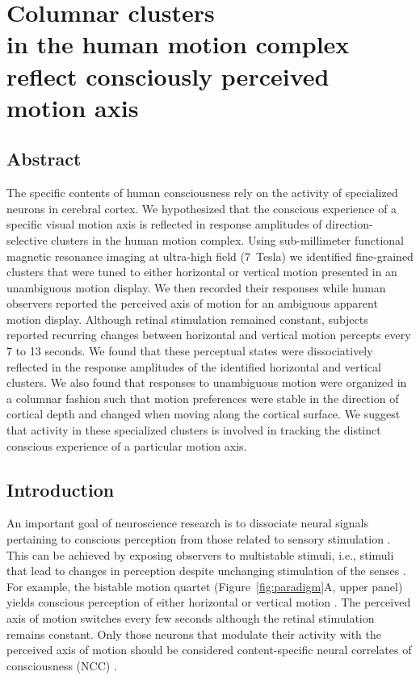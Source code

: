 \chapter[Columnar clusters in the human motion complex\\ reflect consciously perceived motion axis]{Columnar clusters\\ in the human motion complex\\ reflect consciously perceived\\ motion axis}
\label{ch:chapter03}
\papercitetwo

\clearpage{\thispagestyle{empty}\cleardoublepage}

\section{Abstract}
The specific contents of human consciousness rely on the activity of specialized neurons in cerebral cortex. We hypothesized that the conscious experience of a specific visual motion axis is reflected in response amplitudes of direction-selective clusters in the human motion complex. Using sub-millimeter functional magnetic resonance imaging at ultra-high field (7~Tesla) we identified fine-grained clusters that were tuned to either horizontal or vertical motion presented in an unambiguous motion display. We then recorded their responses while human observers reported the perceived axis of motion for an ambiguous apparent motion display. Although retinal stimulation remained constant, subjects reported recurring changes between horizontal and vertical motion percepts every 7 to 13 seconds. We found that these perceptual states were dissociatively reflected in the response amplitudes of the identified horizontal and vertical clusters. We also found that responses to unambiguous motion were organized in a columnar fashion such that motion preferences were stable in the direction of cortical depth and changed when moving along the cortical surface. We suggest that activity in these specialized clusters is involved in tracking the distinct conscious experience of a particular motion axis.

\section{Introduction}
An important goal of neuroscience research is to dissociate neural signals pertaining to conscious perception from those related to sensory stimulation \parencite{Logothetis1989}. This can be achieved by exposing observers to multistable stimuli, i.e., stimuli that lead to changes in perception despite unchanging stimulation of the senses \parencite{Leopold1999, Sterzer2009, Brascamp2018}. For example, the bistable motion quartet (Figure~\ref{fig:paradigm}A, upper panel) yields conscious perception of either horizontal or vertical motion \parencite{Ramachandran1985}. The perceived axis of motion switches every few seconds although the retinal stimulation remains constant. Only those neurons that modulate their activity with the perceived axis of motion should be considered content-specific neural correlates of consciousness (NCC) \parencite{Metzinger2000, Koch2016}.

